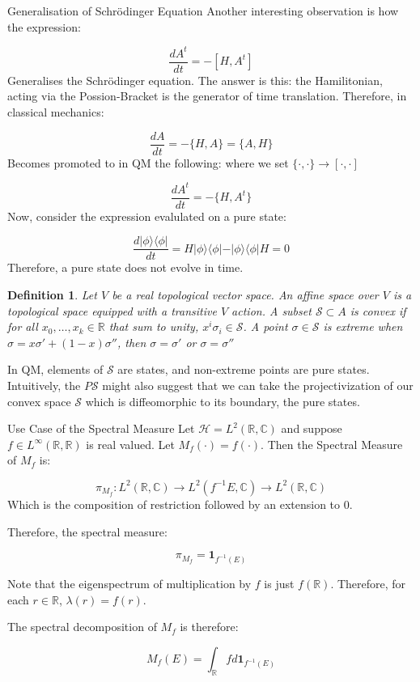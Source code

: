 \documentclass{amsart}
\newtheorem{definition}[theorem]{Definition}
\begin{document}
\begin{example}{Generalisation of Schrödinger Equation}
Another interesting observation is how the expression:

$$\frac{d A^{t}}{dt} = - [H, A^{t}]$$
Generalises the Schrödinger equation. The answer is this: the Hamilitonian, acting via the Possion-Bracket is the generator of time translation. Therefore, in classical mechanics:

$$\frac{dA}{dt} = -\{H, A\}= \{A, H\}$$
Becomes promoted to in QM the following: where we set $\{\cdot, \cdot \} \to [\cdot, \cdot]$

$$\frac{d A^{t}}{dt} = - \{H, A^{t} \}$$
Now, consider the expression evalulated on a pure state:

$$\frac{d \vert \phi \rangle \langle \phi \vert}{dt} = H \vert \phi \rangle \langle \phi \vert  - \vert \phi \rangle \langle \phi \vert H = 0$$
Therefore, a pure state does not evolve in time. 
\end{example}

\begin{definition}
Let $V$ be a real topological vector space. An affine space over $V$ is a topological space equipped with a transitive $V$ action. A subset $\mathcal{S} \subset A$ is convex if for all $x_{0}, \dots, x_{k} \in \mathbb{R}$ that sum to unity, $x^{i} \sigma_{i} \in \mathcal{S}$. A point $\sigma \in \mathcal{S}$ is extreme when $\sigma = x \sigma' + (1-x) \sigma''$, then $\sigma = \sigma'$ or $\sigma = \sigma''$
\end{definition}

In QM, elements of $\mathcal{S}$ are states, and non-extreme points are pure states. Intuitively, the $P \mathcal{S}$ might also suggest that we can take the projectivization of our convex space $\mathcal{S}$ which is diffeomorphic to its boundary, the pure states.

\begin{example}{Use Case of the Spectral Measure}
Let $\mathcal{H} = L^2(\mathbb{R}, \mathbb{C})$ and suppose $f \in L^{\infty}(\mathbb{R}, \mathbb{R})$ is real valued. Let $M_{f} (\cdot) = f (\cdot)$. Then the Spectral Measure of $M_{f}$ is:

$$\pi_{M_{f}}: L^2(\mathbb{R}, \mathbb{C}) \to L^2(f^{-1} E, \mathbb{C}) \to L^2(\mathbb{R}, \mathbb{C})$$
Which is the composition of restriction followed by an extension to $0$. 

Therefore, the spectral measure:

$$\pi_{M_{f}} = \mathbf{1}_{f^{-1} (E)}$$

Note that the eigenspectrum of multiplication by $f$ is just $f(\mathbb{R})$. Therefore, for each $r \in \mathbb{R}$, $\lambda(r) = f(r)$. 

The spectral decomposition of $M_{f}$ is therefore:

$$M_{f}(E) = \int_{\mathbb{R}} f d \mathbf{1}_{f^{-1}(E)} $$
\end{example}
\end{document}
